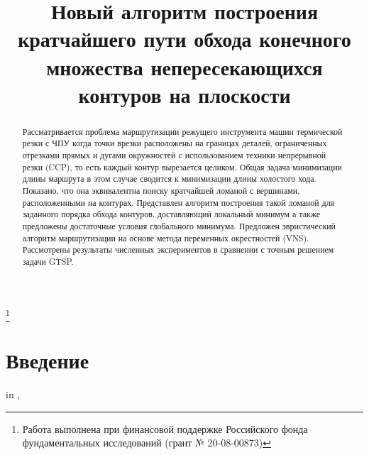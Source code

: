\documentclass[12pt]{a&t}
\begin{document}
\title{
  Новый алгоритм построения кратчайшего пути обхода
  конечного множества непересекающихся контуров на плоскости
}%
\thanks{
  Работа выполнена при финансовой поддержке
  Российского фонда фундаментальных исследований
  (грант № 20-08-00873)
}


\maketitle

\begin{abstract}
Рассматривается проблема маршрутизации режущего
инструмента машин термической резки с ЧПУ
когда точки врезки расположены
на границах деталей,
ограниченных отрезками прямых и дугами окружностей
с использованием техники непрерывной резки
(CCP),
то есть каждый контур вырезается целиком.
Общая задача минимизации длины маршрута
в этом случае сводится к минимизации длины холостого хода.
Показано, что она эквивалентна поиску
кратчайшей ломаной с вершинами,
расположенными на контурах.
Представлен алгоритм построения
такой ломаной для заданного порядка
обхода контуров,
доставляющий локальный минимум
а также предложены достаточные условия
глобального минимума.
Предложен эвристический алгоритм
маршрутизации на основе
метода переменных окрестностей
(VNS).
Рассмотрены результаты численных экспериментов
в сравнении с точным решением задачи GTSP.
\end{abstract}

\section{Введение}

in \cite{bi01,bi02,bi03},







\end{document}
